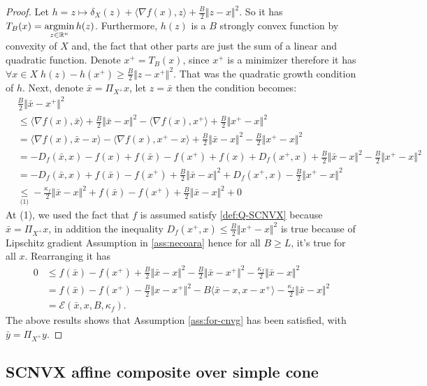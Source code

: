 \documentclass[12pt]{article}
\begin{document}
    \begin{proof}
        Let $h = z \mapsto \delta_X(z) + \langle \nabla f(x), z\rangle + \frac{B}{2}\Vert z - x\Vert^2$.
        So it has $T_B(x) = \mathop{\rm argmin}\limits_{z\in \mathbb R^n} h(z)$. 
        Furthermore, $h(z)$ is a $B$ strongly convex function by convexity of $X$ and, the fact that other parts are just the sum of a linear and quadratic function. 
        Denote $x^+ = T_B(x)$, since $x^+$ is a minimizer therefore it has $\forall x \in X\; h(z) - h(x^+) \ge \frac{B}{2}\Vert z - x^+\Vert^2$. 
        That was the quadratic growth condition of $h$. 
        Next, denote $\bar x  = \Pi_{X^+}x$, let $z = \bar x$ then the condition becomes: 
        \begin{align*}
            & \frac{B}{2}\Vert \bar x - x^+\Vert^2 
            \\
            &\le 
            \langle \nabla f(x), \bar x\rangle + \frac{B}{2}\Vert \bar x - x\Vert^2 - 
            \langle \nabla f(x), x^+\rangle + \frac{B}{2}\Vert x^+ - x\Vert^2
            \\
            &=
            \langle \nabla f(x), \bar x - x\rangle - \langle \nabla f(x), x^+ - x\rangle
            + \frac{B}{2}\Vert \bar x - x\Vert^2 
            - \frac{B}{2}\Vert x^+ - x\Vert^2
            \\
            &= - D_f(\bar x, x) - f(x) + f(\bar x) - f(x^+) + f(x) + D_f(x^+, x)
            + \frac{B}{2}\Vert \bar x - x\Vert^2 
            - \frac{B}{2}\Vert x^+ - x\Vert^2
            \\
            &= 
            - D_f(\bar x, x) + f(\bar x) - f(x^+) 
            + \frac{B}{2}\Vert \bar x - x\Vert^2 
            + D_f(x^+, x)
            - \frac{B}{2}\Vert x^+ - x\Vert^2
            \\
            &\underset{\text{(1)}}{\le} 
            - \frac{\kappa_f}{2}\Vert \bar x - x\Vert^2
            + f(\bar x) - f(x^+)
            + \frac{B}{2}\Vert \bar x - x\Vert^2 
            + 0
        \end{align*}
        At (1), we used the fact that $f$ is assumed satisfy \ref{def:Q-SCNVX} because $\bar x = \Pi_{X^+}x$, in addition the inequality $D_f(x^+, x) \le \frac{B}{2}\Vert x^+ - x\Vert^2$ is true because of Lipschitz gradient Assumption in \ref{ass:necoara} hence for all $B\ge L$, it's true for all $x$. 
        Rearranging it has 
        \begin{align*}
            0 &\le
            f(\bar x) - f(x^+) 
            + \frac{B}{2}\Vert \bar x - x\Vert^2 
            - \frac{B}{2}\Vert \bar x - x^+\Vert^2
            - \frac{\kappa_f}{2}\Vert \bar x - x\Vert^2
            \\
            &= 
            f(\bar x) - f(x^+) 
            - \frac{B}{2}\Vert x - x^+\Vert^2 
            - B\langle \bar x - x, x - x^+\rangle
            - \frac{\kappa_f}{2}\Vert \bar x - x\Vert^2
            \\
            &= \mathcal E(\bar x, x, B, \kappa_f). 
        \end{align*}
        The above results shows that Assumption \ref{ass:for-cnvg} has been satisfied, with $\bar y = \Pi_{X^+}y$. 
    \end{proof}

    \subsection{SCNVX affine composite over simple cone}





\end{document}

